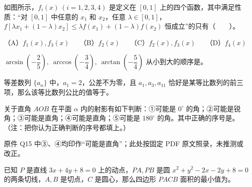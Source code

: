 \begin{question}
如图所示，\(f_i(x)\ (i=1,2,3,4)\) 是定义在 \([0,1]\) 上的四个函数，其中满足性质：“对 \([0,1]\) 中任意的 \(x_1\) 和 \(x_2\)，任意 \(\lambda\in[0,1]\)，\(f[\lambda x_1+(1-\lambda)x_2]\leqslant\lambda f(x_1)+(1-\lambda)f(x_2)\) 恒成立”的只有\mbox{（　　）}。
\nopagebreak[4]
\begin{center}\end{center}
\nopagebreak[4]
（A）\(f_1(x),f_3(x)\)　　（B）\(f_2(x)\)　　（C）\(f_2(x),f_3(x)\)　　（D）\(f_4(x)\)

\end{question}

\begin{question}
\(\arcsin\left(-\dfrac25\right),\ \arccos\left(-\dfrac34\right),\ \arctan\left(-\dfrac54\right)\) 从小到大的顺序是\gkblank{}。

\end{question}
\begin{question}
等差数列 \(\{a_n\}\) 中，\(a_1=2\)，公差不为零，且 \(a_1,a_3,a_{11}\) 恰好是某等比数列的前三项，那么该等比数列公比的值等于\gkblank{}。

\end{question}
\begin{question}
关于直角 \(AOB\) 在平面 \(\alpha\) 内的射影有如下判断：①可能是 \(0^\circ\) 的角；②可能是锐角；③可能是直角；④可能是直角；⑤可能是 \(180^\circ\) 的角。其中正确的序号是\gkblank{}。（注：把你认为正确判断的序号都填上。）

\begin{gktip}
原件 Q15 中③、④均印作“可能是直角”；此处按固定 PDF 原文照录，未推测或改正。
\end{gktip}

\end{question}
\begin{question}
已知 \(P\) 是直线 \(3x+4y+8=0\) 上的动点，\(PA,PB\) 是圆 \(x^2+y^2-2x-2y+8=0\) 的两条切线，\(A,B\) 是切点，\(C\) 是圆心，那么四边形 \(PACB\) 面积的最小值为\gkblank{}。

\end{question}

